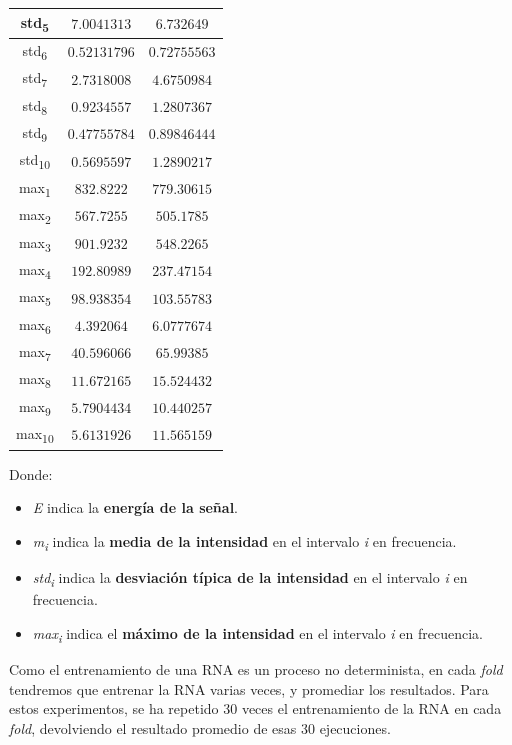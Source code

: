 \documentclass[12pt]{article}
\begin{document}
\begin{table}[!ht]
\begin{tabular}{||c c c||}
			\hline
			std\textsubscript{5} & $7.0041313$ & $6.732649$ \\
			\hline
			std\textsubscript{6} & $0.52131796$ & $0.72755563$ \\
			\hline
			std\textsubscript{7} & $2.7318008$ & $4.6750984$ \\
			\hline
			std\textsubscript{8} & $0.9234557$ & $1.2807367$ \\
			\hline
			std\textsubscript{9} & $0.47755784$ & $0.89846444$ \\
			\hline
			std\textsubscript{10} & $0.5695597$ & $1.2890217$ \\
			\hline
			max\textsubscript{1} & $832.8222$ & $779.30615$ \\
			\hline
			max\textsubscript{2} & $567.7255$ & $505.1785$ \\
			\hline
			max\textsubscript{3} & $901.9232$ & $548.2265$ \\
			\hline
			max\textsubscript{4} & $192.80989$ & $237.47154$ \\
			\hline
			max\textsubscript{5} & $98.938354$ & $103.55783$ \\
			\hline
			max\textsubscript{6} & $4.392064$ & $6.0777674$ \\
			\hline
			max\textsubscript{7} & $40.596066$ & $65.99385$ \\
			\hline
			max\textsubscript{8} & $11.672165$ & $15.524432$ \\
			\hline
			max\textsubscript{9} & $5.7904434$ & $10.440257$ \\
			\hline
			max\textsubscript{10} & $5.6131926$ & $11.565159$ \\
			\hline
		\end{tabular}
	\label{Tab:Features_1}
\end{table}
Donde:
\begin{itemize}
	\item \textit{E} indica la \textbf{energía de la señal}.
	\item \textit{m\textsubscript{i}} indica la \textbf{media de la intensidad} en el intervalo \textit{i} en frecuencia.
	\item \textit{std\textsubscript{i}} indica la \textbf{desviación típica de la intensidad} en el intervalo \textit{i} en frecuencia.
	\item \textit{max\textsubscript{i}} indica el \textbf{máximo de la intensidad} en el intervalo \textit{i} en frecuencia.
\end{itemize}	

\newpage
Como el entrenamiento de una RNA es un proceso no determinista, en cada \textit{fold}
tendremos que entrenar la RNA varias veces, y promediar los resultados. Para estos experimentos,
se ha repetido 30 veces el entrenamiento de la RNA en cada \textit{fold}, devolviendo el resultado promedio de esas 30 ejecuciones.
\end{document}
